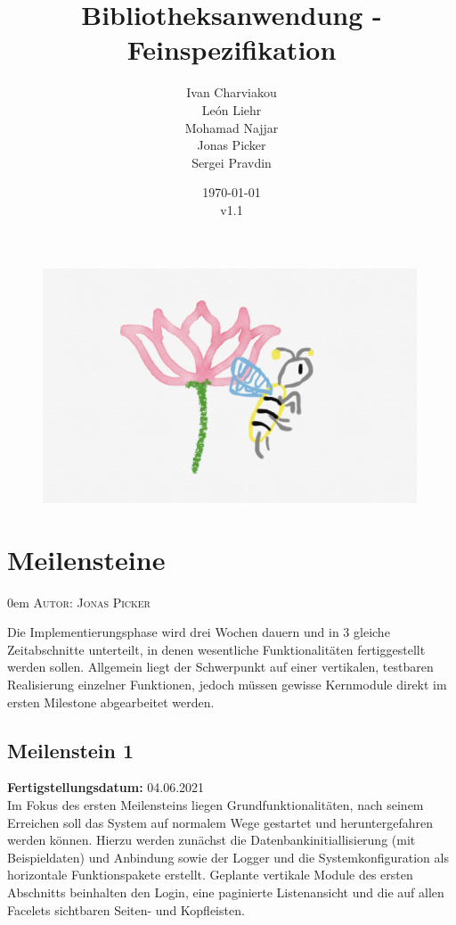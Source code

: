 \documentclass{article}
\title{Bibliotheksanwendung - Feinspezifikation}
\date{\today\\v1.1}
\author{
	Ivan Charviakou\\
	León Liehr\\
	Mohamad Najjar\\
	Jonas Picker\\
	Sergei Pravdin
}
\makeatletter
\newcommand{\sectionauthor}[1]{
	{\parindent 0em \large \scshape Autor: #1 \par \nobreak \vspace*{1em}}
	\@afterheading
}
\makeatother
\begin{document}
\maketitle
\begin{figure}[H]
	\centering
	\includegraphics[width = 30em]{Logo}
\end{figure}
\newpage
\tableofcontents
\newpage


\section{Meilensteine}
\sectionauthor{Jonas Picker}
Die Implementierungsphase wird drei Wochen dauern und in 3 gleiche Zeitabschnitte unterteilt, in denen wesentliche Funktionalitäten fertiggestellt werden sollen. Allgemein liegt der Schwerpunkt auf einer vertikalen, testbaren Realisierung einzelner Funktionen, jedoch müssen gewisse Kernmodule direkt im ersten Milestone abgearbeitet werden. 
\subsection{Meilenstein 1}
\textbf{Fertigstellungsdatum:} 04.06.2021 \\
Im Fokus des ersten Meilensteins liegen Grundfunktionalitäten, nach seinem Erreichen soll das System auf normalem Wege gestartet und heruntergefahren werden können. Hierzu werden zunächst die Datenbankinitiallisierung (mit Beispieldaten) und Anbindung sowie der Logger und die Systemkonfiguration als horizontale Funktionspakete erstellt. Geplante vertikale Module des ersten Abschnitts beinhalten den Login, eine paginierte Listenansicht und die auf allen Facelets sichtbaren Seiten- und Kopfleisten. 
\end{document}
